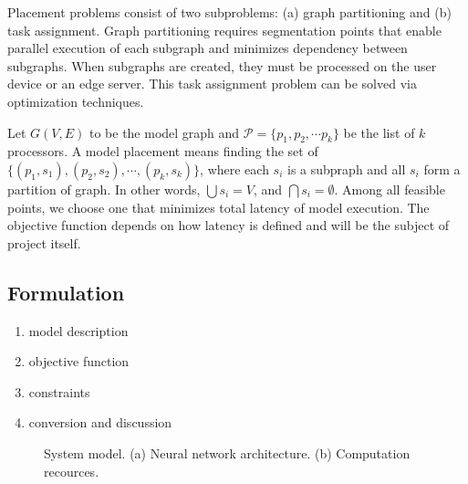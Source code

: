 \documentclass[lettersize,journal]{IEEEtran}
\begin{document}
Placement problems consist of two subproblems: (a) graph partitioning and (b) task assignment. Graph partitioning requires segmentation points that enable parallel execution of each subgraph and minimizes dependency between subgraphs. When subgraphs are created, they must be processed on the user device or an edge server. This task assignment problem can be solved via optimization techniques.

Let $G(V, E)$ to be the model graph and $\mathcal{P} = \{p_1, p_2, \cdots p_k\}$ be the list of $k$ processors. A model placement means finding the set of $\{(p_1, s_1), (p_2, s_2), \cdots, (p_k, s_k)\}$, where each $s_i$ is a subpraph and all $s_i$ form a partition of graph. In other words, $\bigcup s_i = V$, and $\bigcap s_i = \emptyset$. Among all feasible points, we choose one that minimizes total latency of model execution. The objective function depends on how latency is defined and will be the subject of project itself.

\subsection{Formulation}
\begin{enumerate}
\item{model description}
\item{objective function}
\item{constraints}
\item{conversion and discussion}
\end{enumerate}
\begin{figure}[!t]
\centering
{}
\hfil
{}
\caption{System model. (a) Neural network architecture. (b) Computation recources.}
\label{fig_sim}
\end{figure}
\end{document}
